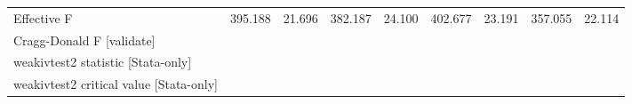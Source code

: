 \begin{tabular}{lcccccccc}
\hline
Effective F & 395.188 & 21.696 & 382.187 & 24.100 & 402.677 & 23.191 & 357.055 & 22.114 \\
Cragg-Donald F [validate] &  &  &  &  &  &  &  &  \\
weakivtest2 statistic [Stata-only] &  &  &  &  &  &  &  &  \\
weakivtest2 critical value [Stata-only] &  &  &  &  &  &  &  &  \\
\hline
\end{tabular}
